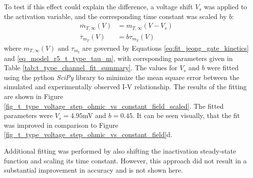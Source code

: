 \documentclass[../main.tex]{subfiles}
\begin{document}
To test if this effect could explain the difference, a voltage shift $V_s$ was applied to the activation variable, and the corresponding time constant was scaled by $b$:
\begin{align}
    \overline{m}_{T,\infty}(V) &= m_{T,\infty}(V-V_s) \label{eq_jeong_m_shift} \\
    \overline{\tau}_{m_T}(V) &= b \tau_{m_T}(V) \label{eq_jeong_tau_scale}
\end{align}
where $m_{T,\infty}(V)$ and $\tau_{m_t}$ are governed by Equations \ref{eq:fit_jeong_gate_kinetics} and \ref{eq_model_r5_t_type_tau_m}, with corrsponding parameters given in Table \ref{tab:t_type_channel_fit_summary}. The values for $V_s$ and $b$ were fitted using the python \textit{SciPy} library to minimize the mean square error between the simulated and experimentally observed I-V relationship. The results of the fitting are shown in Figure \ref{fig_t_type_voltage_step_ohmic_vs_constant_field_scaled}. The fitted parameters were $V_s=4.95$mV and $b=0.45$. It can be seen visually, that the fit was improved in comparison to Figure \ref{fig_t_type_voltage_step_ohmic_vs_constant_field}d.

Additional fitting was performed by also shifting the inactivation steady-state function and scaling its time constant. However, this approach did not result in a substantial improvement in accuracy and is not shown here.




\end{document}
